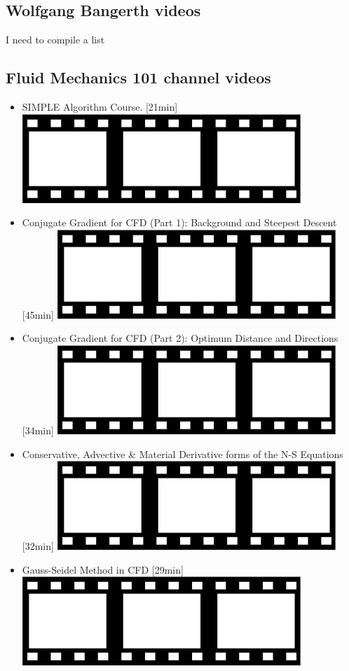 \subsection{Wolfgang Bangerth videos}

{\color{red} I need to compile a list}


\subsection{Fluid Mechanics 101 channel videos}

\begin{itemize}

\item SIMPLE Algorithm Course. [21min]
      \href{https://www.youtube.com/watch?v=z1wMpZeVzMI}{\includegraphics[width=.8cm]{images/pictograms/film.png}}

\item Conjugate Gradient for CFD (Part 1): Background and Steepest Descent [45min]
      \href{https://www.youtube.com/watch?v=jXShvxPcRl4}{\includegraphics[width=.8cm]{images/pictograms/film.png}}

\item Conjugate Gradient for CFD (Part 2): Optimum Distance and Directions [34min]
      \href{https://www.youtube.com/watch?v=MdPhVsgTc1Q}{\includegraphics[width=.8cm]{images/pictograms/film.png}}

\item Conservative, Advective \& Material Derivative forms of the N-S Equations [32min]
      \href{https://www.youtube.com/watch?v=ljdv4T2U464}{\includegraphics[width=.8cm]{images/pictograms/film.png}}

\item Gauss-Seidel Method in CFD [29min]
      \href{https://www.youtube.com/watch?v=ymIvps7pgRk}{\includegraphics[width=.8cm]{images/pictograms/film.png}}


\end{itemize}
